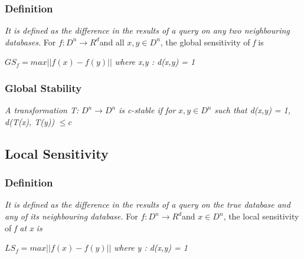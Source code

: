 \documentclass[acmsmall]{acmart}
\begin{document}
\subsubsection{Definition}
\textit{It is defined as the difference in the results of a query on any two neighbouring databases.}
For \begin{math}f: D^n \rightarrow R^d \end{math}and all \begin{math}x, y \in D^n\end{math}, the global sensitivity of \textit{f} is
\newline
\begin{center}
    \begin{math}
        GS_f = max||f(x) - f(y) || 
    \end{math}
    \hspace{2cm} \textit{where x,y : d(x,y) = 1}
\end{center}
\newline
\newline
\subsubsection{Global Stability}
\textit{A transformation T: }\begin{math} D^n \rightarrow D^n \end{math} \textit{is c-stable if for }\begin{math} x, y \in D^n\end{math} \textit{such that d(x,y) = 1, d(T(x), T(y)) }\begin{math}\leq c\end{math}

\subsection{Local Sensitivity}
\subsubsection{Definition}
\textit{It is defined as the difference in the results of a query on the true database and any of its neighbouring database.}
For \begin{math}f: D^n \rightarrow R^d \end{math}and \begin{math}x \in D^n\end{math}, the local sensitivity of \textit{f at x is}
\newline
\begin{center}
    \begin{math}
        LS_f = max||f(x) - f(y) || 
    \end{math}
    \hspace{2cm} \textit{where y : d(x,y) = 1}
\end{center}
\end{document}
